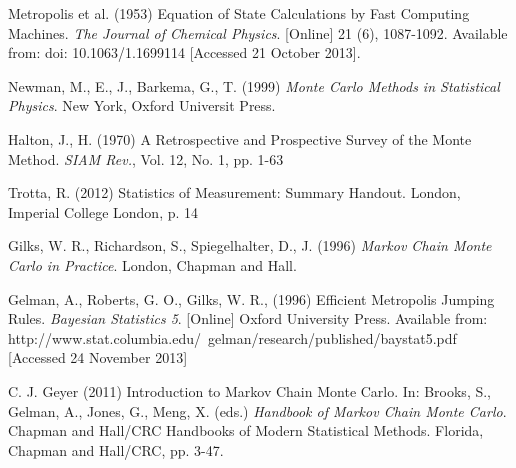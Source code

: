 \documentclass[a4paper,11pt,twoside]{article}
\begin{document}
\begin{thebibliography}{10}


		Metropolis et al. (1953) Equation of State Calculations by Fast
		Computing Machines. \textit{The Journal of Chemical Physics}.
		[Online] 21 (6), 1087-1092. Available from: doi:
		10.1063/1.1699114 [Accessed 21 October 2013].

		Newman, M., E., J., Barkema, G., T. (1999) \textit{Monte Carlo
		Methods in Statistical Physics}. New York, Oxford Universit
		Press.


		Halton, J., H. (1970) A Retrospective and Prospective Survey of
		the Monte Method. \textit{SIAM Rev.}, Vol. 12, No. 1, pp. 1-63
	
		Trotta, R. (2012) Statistics of Measurement: Summary Handout.
		London, Imperial College London, p. 14

		Gilks, W. R., Richardson, S., Spiegelhalter, D., J. (1996)
		\textit{Markov Chain Monte Carlo in Practice}. London, Chapman
		and Hall.
	
		Gelman, A., Roberts, G. O., Gilks, W. R., (1996) Efficient
		Metropolis Jumping Rules. \textit{Bayesian Statistics 5}. [Online]
		Oxford University Press. Available from:
		http://www.stat.columbia.edu/~gelman/research/published/baystat5.pdf
		[Accessed 24 November 2013]

		C. J. Geyer (2011) Introduction to Markov Chain Monte Carlo.
		In: Brooks, S., Gelman, A., Jones, G., Meng, X. (eds.)
		\textit{Handbook of Markov Chain Monte Carlo}. Chapman and
		Hall/CRC Handbooks of Modern Statistical Methods. Florida,
		Chapman and Hall/CRC, pp. 3-47.
	

\end{thebibliography}
\end{document}
